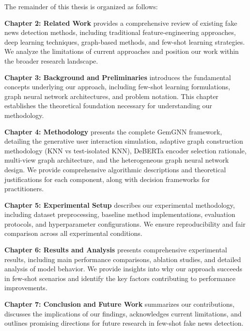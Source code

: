The remainder of this thesis is organized as follows:

\textbf{Chapter 2: Related Work} provides a comprehensive review of existing fake news detection methods, including traditional feature-engineering approaches, deep learning techniques, graph-based methods, and few-shot learning strategies. We analyze the limitations of current approaches and position our work within the broader research landscape.

\textbf{Chapter 3: Background and Preliminaries} introduces the fundamental concepts underlying our approach, including few-shot learning formulations, graph neural network architectures, and problem notation. This chapter establishes the theoretical foundation necessary for understanding our methodology.

\textbf{Chapter 4: Methodology} presents the complete GemGNN framework, detailing the generative user interaction simulation, adaptive graph construction methodology (KNN vs test-isolated KNN), DeBERTa encoder selection rationale, multi-view graph architecture, and the heterogeneous graph neural network design. We provide comprehensive algorithmic descriptions and theoretical justifications for each component, along with decision frameworks for practitioners.

\textbf{Chapter 5: Experimental Setup} describes our experimental methodology, including dataset preprocessing, baseline method implementations, evaluation protocols, and hyperparameter configurations. We ensure reproducibility and fair comparison across all experimental conditions.

\textbf{Chapter 6: Results and Analysis} presents comprehensive experimental results, including main performance comparisons, ablation studies, and detailed analysis of model behavior. We provide insights into why our approach succeeds in few-shot scenarios and identify the key factors contributing to performance improvements.

\textbf{Chapter 7: Conclusion and Future Work} summarizes our contributions, discusses the implications of our findings, acknowledges current limitations, and outlines promising directions for future research in few-shot fake news detection.

\EndChapter
